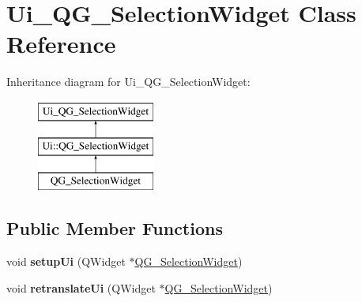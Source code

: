 \hypertarget{classUi__QG__SelectionWidget}{\section{Ui\-\_\-\-Q\-G\-\_\-\-Selection\-Widget Class Reference}
\label{classUi__QG__SelectionWidget}
}
Inheritance diagram for Ui\-\_\-\-Q\-G\-\_\-\-Selection\-Widget\-:\begin{figure}[H]
\begin{center}
\leavevmode
\includegraphics[height=3.000000cm]{classUi__QG__SelectionWidget}
\end{center}
\end{figure}
\subsection*{Public Member Functions}
\begin{DoxyCompactItemize}
\item 
\hypertarget{classUi__QG__SelectionWidget_a2773c1474b3ba79cdac30d85434b5ccb}{void {\bfseries setup\-Ui} (Q\-Widget $\ast$\hyperlink{classQG__SelectionWidget}{Q\-G\-\_\-\-Selection\-Widget})}\label{classUi__QG__SelectionWidget_a2773c1474b3ba79cdac30d85434b5ccb}

\item 
\hypertarget{classUi__QG__SelectionWidget_afaeb58574fd87a7c177340f37dacfb82}{void {\bfseries retranslate\-Ui} (Q\-Widget $\ast$\hyperlink{classQG__SelectionWidget}{Q\-G\-\_\-\-Selection\-Widget})}\label{classUi__QG__SelectionWidget_afaeb58574fd87a7c177340f37dacfb82}

\end{DoxyCompactItemize}
